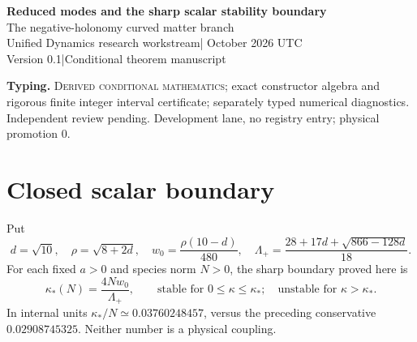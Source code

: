 \documentclass[11pt,a4paper]{article}
\begin{document}
\begin{center}
{\Large\bfseries Reduced modes and the sharp scalar stability boundary}\\[8pt]
{\large The negative-holonomy curved matter branch}\\[10pt]
Unified Dynamics research workstream\quad | October 2026 UTC\\
Version 0.1\quad |\quad Conditional theorem manuscript
\end{center}
\begin{abstract}
We reduce Gauss law, both fixed species norms and their phase symmetries around the nonzero curved scalar branch of the unchanged tetrahedral link--matter Hamiltonian. The resulting 84-dimensional phase space splits linearly into 14 neutral matter oscillator pairs and 28 coupled link--charge pairs. The latter have positive mass matrix and stiffness $4NW-\kappa K$. An exact weighted-curl calculation gives the first zero stiffness at a threefold standard representation and improves the prior sufficient bound by about 29 percent. Below it all reduced modes are oscillatory and the orbit is nonlinearly stable. Above it real growing modes imply nonlinear instability. At equality the linear system has three length-two zero Jordan chains, but an exact outward-rounded integer interval certificate proves a strictly positive critical quartic. The endpoint is consequently nonlinearly stable. This closes the scalar stability boundary, conditional on the declared action and fixed norms. It makes no higher-rank color or physical-identification claim.
\end{abstract}
\textbf{Typing.} \textsc{Derived conditional mathematics}; exact constructor algebra and rigorous finite integer interval certificate; separately typed numerical diagnostics. Independent review pending. Development lane, no registry entry; physical promotion $0$.

\section{Closed scalar boundary}
Put
\[
d=\sqrt{10},\quad \rho=\sqrt{8+2d},\quad
w_0=\frac{\rho(10-d)}{480},\quad
\Lambda_+=\frac{28+17d+\sqrt{866-128d}}{18}.
\]
For each fixed $a>0$ and species norm $N>0$, the sharp boundary proved here is
\[
\boxed{\kappa_*(N)=\frac{4Nw_0}{\Lambda_+},\qquad
\text{stable for }0\leq\kappa\leq\kappa_*;
\quad\text{unstable for }\kappa>\kappa_*.}
\]
In internal units $\kappa_*/N\simeq0.03760248457$, versus the preceding conservative $0.02908745325$. Neither number is a physical coupling.
\end{document}
